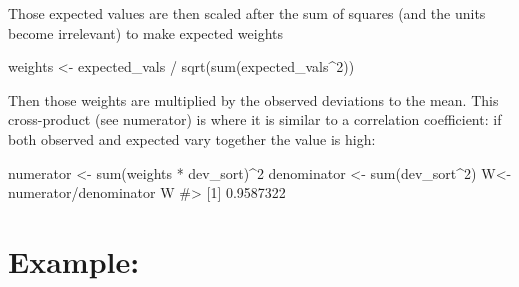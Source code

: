 \documentclass[
  letterpaper,
  DIV=11,
  numbers=noendperiod]{scrreprt}
\newenvironment{Shaded}{\begin{snugshade}}{\end{snugshade}}
\newcommand{\CommentTok}[1]{\textcolor[rgb]{0.37,0.37,0.37}{#1}}
\newcommand{\DecValTok}[1]{\textcolor[rgb]{0.68,0.00,0.00}{#1}}
\newcommand{\FunctionTok}[1]{\textcolor[rgb]{0.28,0.35,0.67}{#1}}
\newcommand{\NormalTok}[1]{\textcolor[rgb]{0.00,0.23,0.31}{#1}}
\newcommand{\OtherTok}[1]{\textcolor[rgb]{0.00,0.23,0.31}{#1}}
\newcommand{\SpecialCharTok}[1]{\textcolor[rgb]{0.37,0.37,0.37}{#1}}
\begin{document}
Those expected values are then scaled after the sum of squares (and the
units become irrelevant) to make expected weights

\begin{Shaded}
\begin{Highlighting}[]
\NormalTok{weights }\OtherTok{\textless{}{-}}\NormalTok{ expected\_vals }\SpecialCharTok{/} \FunctionTok{sqrt}\NormalTok{(}\FunctionTok{sum}\NormalTok{(expected\_vals}\SpecialCharTok{\^{}}\DecValTok{2}\NormalTok{))}
\end{Highlighting}
\end{Shaded}

Then those weights are multiplied by the observed deviations to the
mean. This cross-product (see numerator) is where it is similar to a
correlation coefficient: if both observed and expected vary together the
value is high:

\begin{Shaded}
\begin{Highlighting}[]
\NormalTok{numerator }\OtherTok{\textless{}{-}} \FunctionTok{sum}\NormalTok{(weights }\SpecialCharTok{*}\NormalTok{ dev\_sort)}\SpecialCharTok{\^{}}\DecValTok{2}
\NormalTok{denominator }\OtherTok{\textless{}{-}} \FunctionTok{sum}\NormalTok{(dev\_sort}\SpecialCharTok{\^{}}\DecValTok{2}\NormalTok{)}
\NormalTok{W}\OtherTok{\textless{}{-}}\NormalTok{numerator}\SpecialCharTok{/}\NormalTok{denominator}
\NormalTok{W}
\CommentTok{\#\textgreater{} [1] 0.9587322}
\end{Highlighting}
\end{Shaded}

\section{Example:}\label{example-13}
\end{document}
